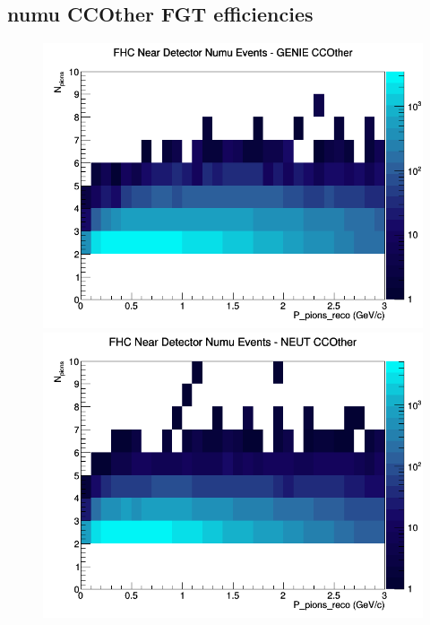 \documentclass[12pt]{article}
\begin{document}
\subsection{numu CCOther FGT efficiencies}
\begin{figure}[h]
\includegraphics[width=\linewidth]{eff_N_P/FGT/pions/CCOther_FHC_ND_numu_N_P_GENIE.png}
\endminipage
{}
\includegraphics[width=\linewidth]{eff_N_P/FGT/pions/CCOther_FHC_ND_numu_N_P_NEUT.png}
\endminipage
{}

\end{figure}
\end{document}
